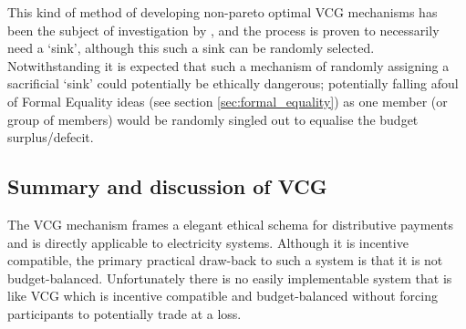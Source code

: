 This kind of method of developing non-pareto optimal VCG mechanisms has been the subject of investigation by \cite{NATH2019673}, and the process is proven to necessarily need a `sink', although this such a sink can be randomly selected.
Notwithstanding it is expected that such a mechanism of randomly assigning a sacrificial `sink' could potentially be ethically dangerous; potentially falling afoul of Formal Equality ideas (see section \ref{sec:formal_equality}) as one member (or group of members) would be randomly singled out to equalise the budget surplus/defecit.







\subsection{Summary and discussion of VCG}\label{subsec:summary_discussion_VCG}

The VCG mechanism frames a elegant ethical schema for distributive payments and is directly applicable to electricity systems.
Although it is incentive compatible, the primary practical draw-back to such a system is that it is not budget-balanced.
Unfortunately there is no easily implementable system that is like VCG which is incentive compatible and budget-balanced without forcing participants to potentially trade at a loss.

